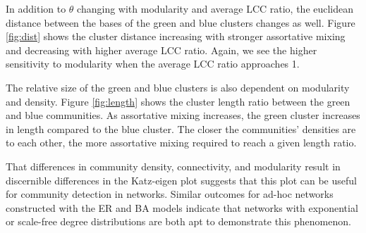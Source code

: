 \documentclass{IEEEtran}
\begin{document}
	In addition to $\theta$ changing with modularity and average LCC ratio, the euclidean distance between the bases of the green and blue clusters changes as well. Figure \ref{fig:dist} shows the cluster distance increasing with stronger assortative mixing and decreasing with higher average LCC ratio. Again, we see the higher sensitivity to modularity when the average LCC ratio approaches 1.
	
	The relative size of the green and blue clusters is also dependent on modularity and density. Figure \ref{fig:length} shows the cluster length ratio between the green and blue communities. As assortative mixing increases, the green cluster increases in length compared to the blue cluster. The closer the communities' densities are to each other, the more assortative mixing required to reach a given length ratio.
	
	That differences in community density, connectivity, and modularity result in discernible differences in the Katz-eigen plot suggests that this plot can be useful for community detection in networks. Similar outcomes for ad-hoc networks constructed with the ER and BA models indicate that networks with exponential or scale-free degree distributions are both apt to demonstrate this phenomenon.
\end{document}
